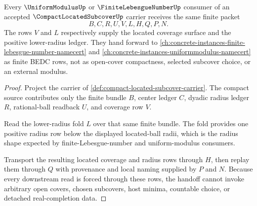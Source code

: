 \begin{theorem}
\label{thm:compact-located-subcover-uniform-modulus-handoff}
Every $\UniformModulusUp$ or $\FiniteLebesgueNumberUp$ consumer of an accepted $\CompactLocatedSubcoverUp$ carrier receives the same finite packet
$$
B,C,R,U,V,L,H,Q,P,N.
$$
The rows $V$ and $L$ respectively supply the located coverage surface and the positive lower-radius ledger. They hand forward to \autoref{ch:concrete-instances-finite-lebesgue-number-namecert} and \autoref{ch:concrete-instances-uniformmodulus-namecert} as finite BEDC rows, not as open-cover compactness, selected subcover choice, or an external modulus.
\end{theorem}
\begin{proof}
Project the carrier of \autoref{def:compact-located-subcover-carrier}. The compact source contributes only the finite bundle $B$, center ledger $C$, dyadic radius ledger $R$, rational-ball readback $U$, and coverage row $V$.

Read the lower-radius fold $L$ over that same finite bundle. The fold provides one positive radius row below the displayed located-ball radii, which is the radius shape expected by finite-Lebesgue-number and uniform-modulus consumers.

Transport the resulting located coverage and radius rows through $H$, then replay them through $Q$ with provenance and local naming supplied by $P$ and $N$. Because every downstream read is forced through these rows, the handoff cannot invoke arbitrary open covers, chosen subcovers, host minima, countable choice, or detached real-completion data.
\end{proof}


\begin{closurestatus}{\CompactLocatedSubcoverUp}
  \theoryclosure{\seedClosure}
  \formalstatus{\unformalizedV}
\end{closurestatus}
